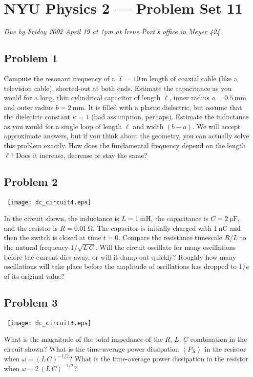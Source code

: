 \documentclass{article}
\begin{document}
\thispagestyle{empty}
\section*{NYU Physics 2 --- Problem Set 11}

\emph{Due by Friday 2002 April 19 at 1pm at Irene Port's office in
Meyer 424.}

\subsection*{Problem 1}

Compute the resonant frequency of a $\ell=10~\mathrm{m}$ length of
coaxial cable (like a television cable), shorted-out at both ends.
Estimate the capacitance as you would for a long, thin cylindrical
capacitor of length $\ell$, inner radius $a=0.5~\mathrm{mm}$ and outer
radius $b=2~\mathrm{mm}$.  It is filled with a plastic dielectric, but
assume that the dielectric constant $\kappa=1$ (bad assumption,
perhaps).  Estimate the inductance as you would for a single loop of
length $\ell$ and width $(b-a)$.  We will accept approximate answers,
but if you think about the geometry, you can actually solve this
problem exactly.  How does the fundamental frequency depend on the
length $\ell$?  Does it increase, decrease or stay the same?

\subsection*{Problem 2}

\noindent
~\hfill\texttt{[image: dc\_circuit4.eps]}\hfill~

In the circuit shown, the inductance is $L=1~\mathrm{mH}$, the
capacitance is $C= 2~\mathrm{\mu F}$, and the resistor is
$R=0.01~\mathrm{\Omega}$.  The capacitor is initially charged with
$1~\mathrm{nC}$ and then the switch is closed at time $t=0$.  Compare
the resistance timescale $R/L$ to the natural frequency
$1/\sqrt{L\,C}$.  Will the circuit oscillate for many oscillations
before the current dies away, or will it damp out quickly?  Roughly
how many oscillations will take place before the amplitude of
oscillations has dropped to $1/e$ of its original value?

\subsection*{Problem 3}

\noindent
~\hfill\texttt{[image: dc\_circuit3.eps]}\hfill~

What is the magnitude of the total impedance of the $R$, $L$, $C$
combination in the circuit shown?  What is the time-average power
dissipation $\left<P_R\right>$ in the resistor when
$\omega=(L\,C)^{-1/2}$?  What is the time-average power dissipation in
the resistor when $\omega=2\,(L\,C)^{-1/2}$?
\end{document}
